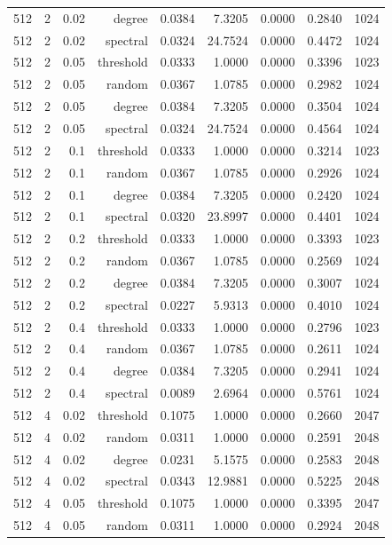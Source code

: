 \begin{table}[t]
\begin{tabular}{lrrrrrrrr}
512 & 2 & 0.02 & degree & 0.0384 & 7.3205 & 0.0000 & 0.2840 & 1024 \\
512 & 2 & 0.02 & spectral & 0.0324 & 24.7524 & 0.0000 & 0.4472 & 1024 \\
512 & 2 & 0.05 & threshold & 0.0333 & 1.0000 & 0.0000 & 0.3396 & 1023 \\
512 & 2 & 0.05 & random & 0.0367 & 1.0785 & 0.0000 & 0.2982 & 1024 \\
512 & 2 & 0.05 & degree & 0.0384 & 7.3205 & 0.0000 & 0.3504 & 1024 \\
512 & 2 & 0.05 & spectral & 0.0324 & 24.7524 & 0.0000 & 0.4564 & 1024 \\
512 & 2 & 0.1 & threshold & 0.0333 & 1.0000 & 0.0000 & 0.3214 & 1023 \\
512 & 2 & 0.1 & random & 0.0367 & 1.0785 & 0.0000 & 0.2926 & 1024 \\
512 & 2 & 0.1 & degree & 0.0384 & 7.3205 & 0.0000 & 0.2420 & 1024 \\
512 & 2 & 0.1 & spectral & 0.0320 & 23.8997 & 0.0000 & 0.4401 & 1024 \\
512 & 2 & 0.2 & threshold & 0.0333 & 1.0000 & 0.0000 & 0.3393 & 1023 \\
512 & 2 & 0.2 & random & 0.0367 & 1.0785 & 0.0000 & 0.2569 & 1024 \\
512 & 2 & 0.2 & degree & 0.0384 & 7.3205 & 0.0000 & 0.3007 & 1024 \\
512 & 2 & 0.2 & spectral & 0.0227 & 5.9313 & 0.0000 & 0.4010 & 1024 \\
512 & 2 & 0.4 & threshold & 0.0333 & 1.0000 & 0.0000 & 0.2796 & 1023 \\
512 & 2 & 0.4 & random & 0.0367 & 1.0785 & 0.0000 & 0.2611 & 1024 \\
512 & 2 & 0.4 & degree & 0.0384 & 7.3205 & 0.0000 & 0.2941 & 1024 \\
512 & 2 & 0.4 & spectral & 0.0089 & 2.6964 & 0.0000 & 0.5761 & 1024 \\
512 & 4 & 0.02 & threshold & 0.1075 & 1.0000 & 0.0000 & 0.2660 & 2047 \\
512 & 4 & 0.02 & random & 0.0311 & 1.0000 & 0.0000 & 0.2591 & 2048 \\
512 & 4 & 0.02 & degree & 0.0231 & 5.1575 & 0.0000 & 0.2583 & 2048 \\
512 & 4 & 0.02 & spectral & 0.0343 & 12.9881 & 0.0000 & 0.5225 & 2048 \\
512 & 4 & 0.05 & threshold & 0.1075 & 1.0000 & 0.0000 & 0.3395 & 2047 \\
512 & 4 & 0.05 & random & 0.0311 & 1.0000 & 0.0000 & 0.2924 & 2048 \\

\end{tabular}
\end{table}
